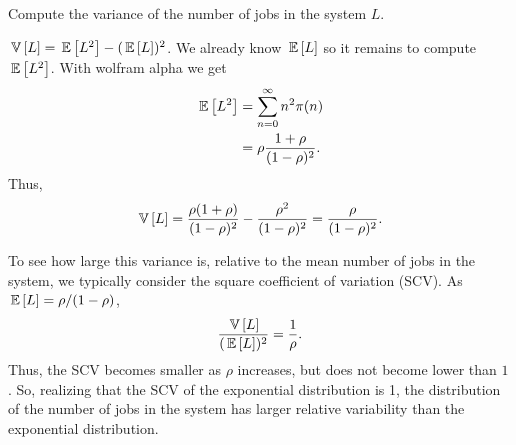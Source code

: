 \begin{question}
  Compute the variance of the number of jobs in the system $L$. 
  \begin{solution}
    $\,\mathbb{V}\left[L\right] = \,\mathbb{E}\left[L^2\right] - (\,\mathbb{E}\left[L\right])^2$. We already know $\,\mathbb{E}\left[L\right]$ so it remains
    to compute $\,\mathbb{E}\left[L^2\right]$. With wolfram alpha we get
    \begin{equation*}
      \begin{split}
      \,\mathbb{E}\left[L^2 \right]
&= \sum_{n=0}^\infty n^2 \pi(n) \\
&= \rho \frac{1+\rho}{(1-\rho)^2}.
      \end{split}
    \end{equation*}
    Thus,
\begin{equation*}
\,\mathbb{V}\left[L\right] = \frac{\rho(1+\rho)}{(1-\rho)^2}-\frac{\rho^2}{(1-\rho)^2} = \frac{\rho}{(1-\rho)^2}.
\end{equation*}

To see how large this variance is, relative to the mean number of jobs
in the system, we typically consider the square coefficient of
variation (SCV). As $\,\mathbb{E}\left[L\right] = \rho/(1-\rho)$,
\begin{equation*}
  \frac{\,\mathbb{V}\left[L\right]}{(\,\mathbb{E}\left[L\right])^2} = \frac 1 \rho.
\end{equation*}
Thus, the SCV becomes smaller as $\rho$ increases, but does not become
lower than $1$. So, realizing that the SCV of the exponential
distribution is 1, the distribution of the number of jobs in the
system has larger relative variability than the exponential
distribution.



\end{solution}
\end{question}
